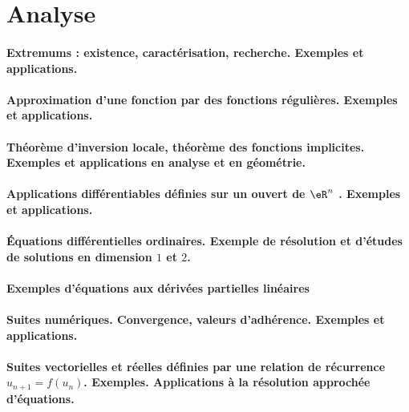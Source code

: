 \section{Analyse}

\paragraph{Extremums : existence, caractérisation, recherche. Exemples et applications.}
\paragraph{Approximation d'une fonction par des fonctions régulières.  Exemples et applications.}
\paragraph{Théorème d'inversion locale, théorème des fonctions implicites. Exemples et applications en analyse et en géométrie.}
\paragraph{Applications différentiables définies sur un ouvert de $\eR^n$ . Exemples et applications.}
\paragraph{Équations différentielles ordinaires. Exemple de résolution et d'études de solutions en dimension \( 1\) et \( 2\).}
\paragraph{Exemples d'équations aux dérivées partielles linéaires}
\paragraph{Suites numériques. Convergence, valeurs d'adhérence. Exemples et applications.}
\paragraph{Suites vectorielles et réelles définies par une relation de récurrence \( u_{n+1}=f(u_n)\). Exemples. Applications à la résolution approchée d'équations.}
